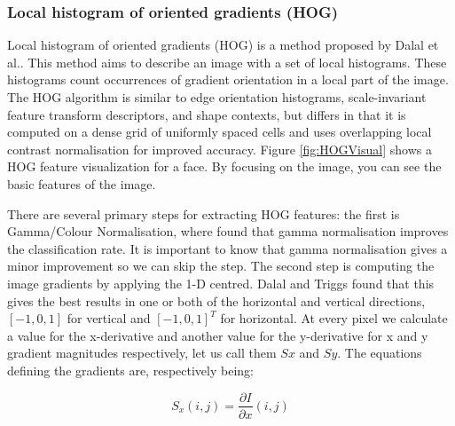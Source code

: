 
\subsubsection{Local histogram of oriented gradients (HOG)}

Local histogram of oriented gradients (HOG) is a method proposed by Dalal et al.\citep{dalal2005histograms}. This method aims to describe an image with a set of local histograms. These histograms count occurrences of gradient orientation in a local part of the image. The HOG algorithm is similar to edge orientation histograms, scale-invariant feature transform descriptors, and shape contexts, but differs in that it is computed on a dense grid of uniformly spaced cells and uses overlapping local contrast normalisation for improved accuracy\citep{dalal2005histograms}. Figure \ref{fig:HOGVisual} shows a HOG feature visualization for a face. By focusing on the image, you can see the basic features of the image.

There are several primary steps for extracting HOG features: the first is Gamma/Colour Normalisation, where \citet{dalal2005histograms} found that gamma normalisation improves the classification rate. It is important to know that gamma normalisation gives a minor improvement so we can skip the step. The second step is computing the image gradients by applying the 1-D centred. Dalal and Triggs found that this gives the best results in one or both of the horizontal and vertical directions, $ [-1,0,1] $ for vertical and $ [-1,0,1] ^T$ for horizontal.
At every pixel we calculate a value for the x-derivative and another value for the y-derivative for x and y gradient magnitudes respectively, let us call them $Sx$ and $Sy$. The equations defining the gradients are, respectively being:


\begin{equation}\label{eq:HOG1}
S_x (i,j) = \frac{\partial I}{\partial x} (i,j)
\end{equation}

